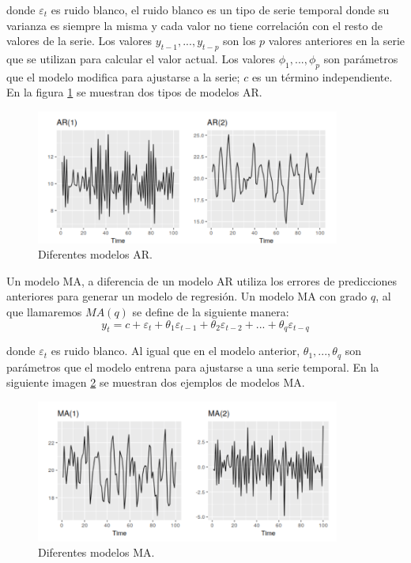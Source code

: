 \noindent donde $\varepsilon_t$ es ruido blanco, el ruido blanco es un tipo de serie temporal donde su varianza es siempre la misma y cada valor no tiene correlación con el resto de valores de la serie. Los valores $y_{t-1}, ..., y_{t-p}$ son los $p$ valores anteriores en la serie que se utilizan para calcular el valor actual. Los valores $\phi_1, ..., \phi_p$ son parámetros que el modelo modifica para ajustarse a la serie; $c$ es un término independiente. En la figura \ref{fig:211} se muestran dos tipos de modelos AR.\newline

\begin{figure}[h]
	\centering
	\includegraphics[width=100mm]{imagenes/autoregression_example.png}
	\caption{Diferentes modelos AR.}
	\label{fig:211}
\end{figure}
\verticalspace

Un modelo MA, a diferencia de un modelo AR utiliza los errores de predicciones anteriores para generar un modelo de regresión. Un modelo MA con grado $q$, al que llamaremos $MA(q)$ se define de la siguiente manera:
$$ y_t = c + \varepsilon_t + \theta_1 \varepsilon_{t-1} + \theta_2 \varepsilon_{t-2} + ... + \theta_q \varepsilon_{t-q}$$

\noindent donde $\varepsilon_t$ es ruido blanco. Al igual que en el modelo anterior, $\theta_1, ..., \theta_q$ son parámetros que el modelo entrena para ajustarse a una serie temporal. En la siguiente imagen \ref{fig:212} se muestran dos ejemplos de modelos MA.

\newpage

\begin{figure}[h]
	\centering
	\includegraphics[width=100mm]{imagenes/moving_averages_example.png}
	\caption{Diferentes modelos MA.}
	\label{fig:212}
\end{figure}

